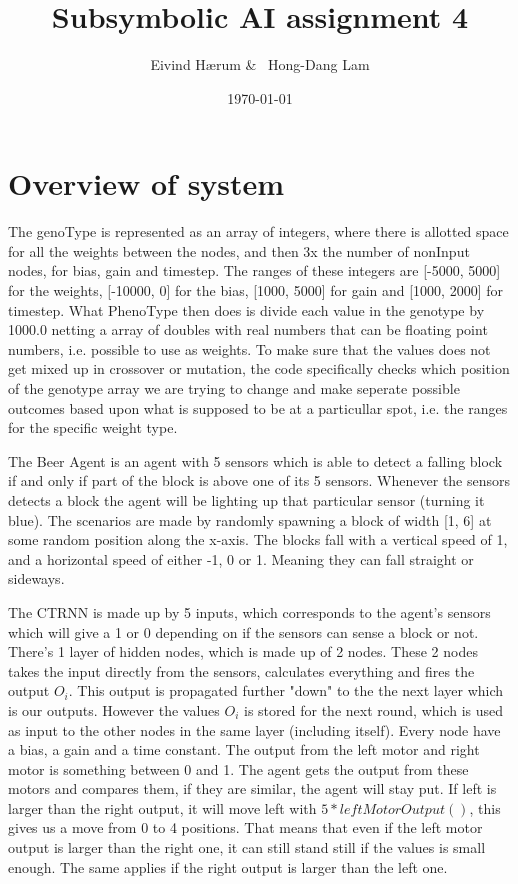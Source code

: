 \documentclass[12pt, a4paper]{article}
\title{Subsymbolic AI assignment 4}
\author{Eivind Hærum \& \ Hong-Dang Lam}
\date{\today} %
\begin{document}
\maketitle
% 
% 
\newpage

\tableofcontents
{}
\newpage

\section{Overview of system}
The genoType is represented as an array of integers, where there is allotted space for all the weights between the nodes, and then 3x the number of nonInput nodes, for bias, gain and timestep. The ranges of these integers are [-5000, 5000] for the weights, [-10000, 0] for the bias, [1000, 5000] for gain and [1000, 2000] for timestep. What PhenoType then does is divide each value in the genotype by 1000.0 netting a array of doubles with real numbers that can be floating point numbers, i.e. possible to use as weights. To make sure that the values does not get mixed up in crossover or mutation, the code  specifically checks which position of the genotype array we are trying to change and make seperate possible outcomes based upon what is supposed to be at a particullar spot, i.e. the ranges for the specific weight type. 


The Beer Agent is an agent with 5 sensors which is able to detect a falling block if and only if part of the block is above one of its 5 sensors. Whenever the sensors detects a block the agent will be lighting up that particular sensor (turning it blue).
The scenarios are made by randomly spawning a block of width [1, 6] at some random position along the x-axis. The blocks fall with a vertical speed of 1, and a horizontal speed of either -1, 0 or 1. Meaning they can fall straight or sideways.

The CTRNN is made up by 5 inputs, which corresponds to the agent's sensors which will give a 1 or 0 depending on if the sensors can sense a block or not. There's 1 layer of hidden nodes, which is made up of 2 nodes. These 2 nodes takes the input directly from the sensors, calculates everything and fires the output $ O_i $. This output is propagated further "down" to the the next layer which is our outputs. However the values $ O_i $ is stored for the next round, which is used as input to the other nodes in the same layer (including itself). Every node have a bias, a gain and a time constant.
The output from the left motor and right motor is something between 0 and 1. The agent gets the output from these motors and compares them, if they are similar, the agent will stay put. If left is larger than the right output, it will move left with $ 5*leftMotorOutput() $, this gives us a move from 0 to 4 positions. That means that even if the left motor output is larger than the right one, it can still stand still if the values is small enough. The same applies if the right output is larger than the left one.
\end{document}
